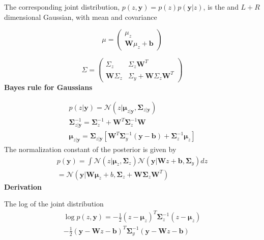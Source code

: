 \documentclass[10pt,landscape]{article}
\newcommand{\N}{\mathcal{N}}
\newcommand{\out}{\textbf{y}}
\newcommand{\weight}{\mathbf{W}}
\newcommand{\Cov}{\mathbf{\Sigma}}
\newcommand{\Mean}{\boldsymbol{\mu}}
\newcommand{\bias}{\mathbf{b}}
\begin{document}
\begin{multicols*}{3}
The corresponding joint distribution, $p(z,\out)=p(z)p(\out|z)$, is the and $L+R$ dimensional Gaussian, with mean and covariance 

\[
\mu =
\begin{pmatrix}
\mu_z \\
\mathbf{W} \mu_z + \mathbf{b}
\end{pmatrix}
\]

\[
\Sigma =
\begin{pmatrix}
\Sigma_z & \Sigma_z \mathbf{W}^T \\
\mathbf{W} \Sigma_z & \Sigma_y + \mathbf{W} \Sigma_z \mathbf{W}^T
\end{pmatrix}
\]
\textbf{Bayes rule for Gaussians}

\begin{align*}
    p(z|\out)=\N(z|\Mean_{z|\out},\Cov_{z|\out}) \\
    \Cov_{z|\out}^{-1}=\Cov_{z}^{-1} + \weight^T\Cov_{z}^{-1}\weight \\ 
    \Mean_{z|\out}= \Cov_{z|\out}[\weight^T\Cov_y^{-1}(\out-\bias)+\Cov_z^{-1}\Mean_z]
\end{align*}
The normalization constant of the posterior is given by
\begin{align*}
    p(\out)=\int\N(z|\Mean_z,\Cov_z)\N(\out|\weight z + \bias,\Cov_y)dz \\= \N(\out|\weight\Mean_z+b,\Cov_z+\weight\Cov_z\weight^T)
\end{align*}
\textbf{Derivation}

The log of the joint distribution
\begin{align*}
    \log p(z,\out)=-\frac{1}{2}(z-\Mean_z)^T\Cov_z^{-1}(z-\Mean_z)\\ -\frac{1}{2}(\out-\weight z-\bias)^T\Cov_y^{-1}(\out-\weight z - \bias)
\end{align*}
 
\end{multicols*}
\end{document}
